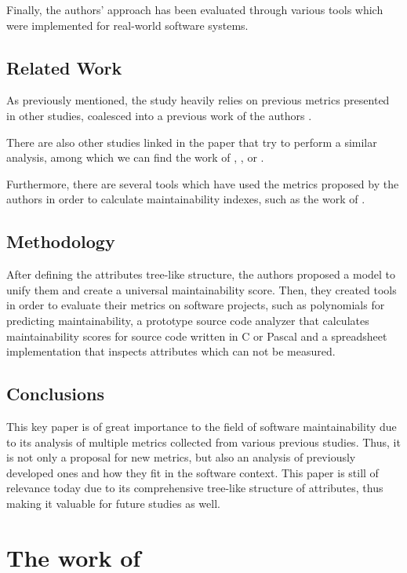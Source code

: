 \documentclass[a4paper,12pt]{article}
\begin{document}
Finally, the authors' approach has been evaluated through various tools which were
implemented for real-world software systems.

\subsection{Related Work}

As previously mentioned, the study heavily relies on previous metrics presented 
in other studies, coalesced into a previous work of the authors 
\citep{oman1992definition}. 

There are also other studies linked in the paper that try to perform a similar analysis,
among which we can find the work of \citet{basili1983empirical}, 
\citet{peercy1981software}, \citet{selby1989software} or \citet{kafura1987use}.

Furthermore, there are several tools which have used the metrics proposed by the
authors in order to calculate maintainability indexes, such as the work of
\citet{omen1992construction}.

\subsection{Methodology}

After defining the attributes tree-like structure, the authors proposed
a model to unify them and create a universal maintainability score. Then,
they created tools in order to evaluate their metrics on software projects,
such as polynomials for predicting maintainability, a prototype source code
analyzer that calculates maintainability scores for source code written in
C or Pascal and a spreadsheet implementation that inspects attributes which
can not be measured.

\subsection{Conclusions}

This key paper is of great importance to the field of software maintainability
due to its analysis of multiple metrics collected from various previous studies.
Thus, it is not only a proposal for new metrics, but also an analysis of 
previously developed ones and how they fit in the software context. This paper
is still of relevance today due to its comprehensive tree-like structure of 
attributes, thus making it valuable for future studies as well.

\section{The work of \cite{pfleeger1990framework}}
\end{document}
